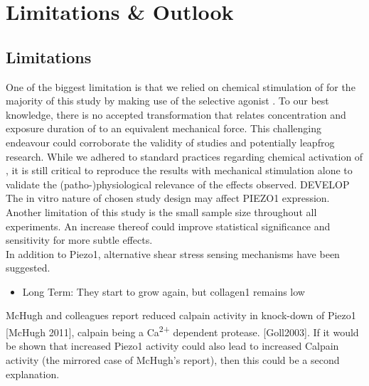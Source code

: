 \chapter{Limitations \& Outlook}

\section{Limitations}
One of the biggest limitation is that we relied on chemical stimulation of \Piezo{} for the majority of this study by making use of the selective \Piezo{} agonist \Yoda{}. To our best knowledge, there is no accepted transformation that relates concentration and exposure duration of \Yoda{} to an equivalent mechanical force. This challenging endeavour could corroborate the validity of \Yoda{} studies and potentially leapfrog \Piezo{} research. While we adhered to standard practices regarding chemical activation of \Piezo{}\cite{Morley2018}, it is still critical to reproduce the results with mechanical stimulation alone to validate the (patho-)physiological relevance of the effects observed. DEVELOP The in vitro nature of chosen study design may affect PIEZO1 expression. 
Another limitation of this study is the small sample size throughout all experiments. An increase thereof could improve statistical significance and sensitivity for more subtle effects.\\




In addition to Piezo1, alternative shear stress sensing mechanisms have been suggested.


\begin{itemize}
    \item Long Term: They start to grow again, but collagen1 remains low

\end{itemize}

McHugh and colleagues report reduced calpain activity in knock-down of Piezo1 [McHugh 2011], calpain being a Ca\textsuperscript{2+} dependent protease. [Goll2003]. If it would be shown that increased Piezo1 activity could also lead to increased Calpain activity (the mirrored case of McHugh's report), then this could be a second explanation.
